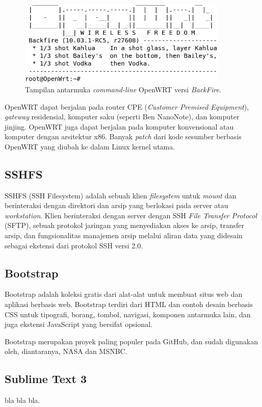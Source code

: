       \begin{figure}[ht!]
        \centering
          \includegraphics[width=10cm]{gambar/openwrt}
          \caption{Tampilan antarmuka \emph{command-line} OpenWRT versi \emph{BackFire}.}
          \label{openwrt}
      \end{figure}

    OpenWRT dapat berjalan pada router CPE (\emph{Customer Premised Equipment}), \emph{gateway} residensial, komputer saku (seperti Ben NanoNote), dan komputer jinjing. OpenWRT juga dapat berjalan pada komputer konvensional atau komputer dengan arsitektur x86. Banyak \emph{patch} dari kode sesumber berbasis OpenWRT yang diubah ke dalam Linux kernel utama.

  \subsection{SSHFS}
    SSHFS (SSH Filesystem) adalah sebuah klien \emph{filesystem} untuk \emph{mount} dan berinteraksi dengan direktori dan arsip yang berlokasi pada server atau \emph{workstation}. Klien berinteraksi dengan server dengan SSH \emph{File Transfer Protocol} (SFTP), sebuah protokol jaringan yang menyediakan akses ke arsip, transfer arsip, dan fungsionalitas manajemen arsip melalui aliran data yang didesain sebagai ekstensi dari protokol SSH versi 2.0.

  \subsection{Bootstrap}
    Bootstrap adalah koleksi gratis dari alat-alat untuk membuat situs web dan aplikasi berbasis web. Bootstrap terdiri dari HTML dan contoh desain berbasis CSS untuk tipografi, borang, tombol, navigasi, komponen antarmuka lain, dan juga ekstensi JavaScript yang bersifat opsional.

    Bootstrap merupakan proyek paling populer pada GitHub, dan sudah digunakan oleh, diantaranya, NASA dan MSNBC.

  \subsection{Sublime Text 3}
    bla bla bla.

